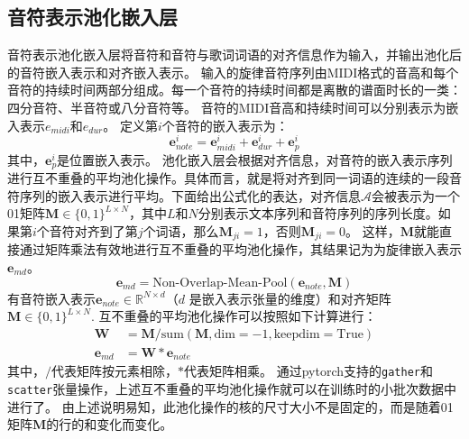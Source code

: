 \subsection{音符表示池化嵌入层}
\label{sec:note_pooling}
音符表示池化嵌入层将音符和音符与歌词词语的对齐信息作为输入，并输出池化后的音符嵌入表示和对齐嵌入表示。
输入的旋律音符序列由MIDI格式的音高和每个音符的持续时间两部分组成。每一个音符的持续时间都是离散的谱面时长的一类：四分音符、半音符或八分音符等。
音符的MIDI音高和持续时间可以分别表示为嵌入表示$e_{midi}$和$e_{dur}$。
定义第$i$个音符的嵌入表示为：
\begin{equation}
\label{eq:note}
    \mathbf{e}_{note}^i=\mathbf{e}_{midi}^i+\mathbf{e}_{dur}^i+\mathbf{e}_p^i
\end{equation}
其中，$\mathbf{e}_p^i$是位置嵌入表示。
池化嵌入层会根据对齐信息，对音符的嵌入表示序列进行互不重叠的平均池化操作。具体而言，就是将对齐到同一词语的连续的一段音符序列的嵌入表示进行平均。下面给出公式化的表达，对齐信息$\mathcal{A}$会被表示为一个01矩阵$\mathbf{M} \in \{0,1\}^{L \times N}$，其中$L$和$N$分别表示文本序列和音符序列的序列长度。如果第$i$个音符对齐到了第$j$个词语，那么$\mathbf{M}_{ji}=1$，否则$\mathbf{M}_{ji}=0$。
这样，$\mathbf{M}$就能直接通过矩阵乘法有效地进行互不重叠的平均池化操作，其结果记为为旋律嵌入表示$\mathbf{e}_{md}$。
\begin{equation}
\label{eq:md_embed}
    \mathbf{e}_{md} = \text{Non-Overlap-Mean-Pool}(\mathbf{e}_{note}, \mathbf{M})
\end{equation}
有音符嵌入表示$\mathbf{e}_{note} \in \mathbb{R}^{N \times d}$（$d$ 是嵌入表示张量的维度）和对齐矩阵$\mathbf{M} \in \{0, 1\}^{L \times N}$.
互不重叠的平均池化操作可以按照如下计算进行：
\begin{align*}
\mathbf{W} &= \mathbf{M} / \text{sum}(\mathbf{M}, \text{dim}=-1, \text{keepdim}=\text{True}) \\
\mathbf{e}_{md} &= \mathbf{W} * \mathbf{e}_{note}
\end{align*}
其中，$/$代表矩阵按元素相除，$*$代表矩阵相乘。
通过pytorch支持的\texttt{gather}和\texttt{scatter}张量操作，上述互不重叠的平均池化操作就可以在训练时的小批次数据中进行了。
由上述说明易知，此池化操作的核的尺寸大小不是固定的，而是随着01矩阵$\mathbf{M}$的行的和变化而变化。

